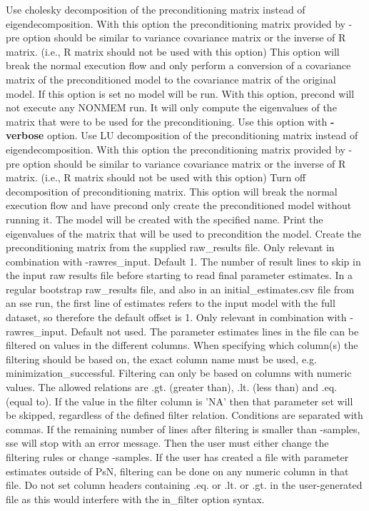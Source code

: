 \begin{optionlist}
Use cholesky decomposition of the preconditioning matrix instead of eigendecomposition.  With this option the preconditioning matrix provided by -pre option should be similar to variance covariance matrix or the inverse of R matrix.  (i.e., R matrix should not be used with this option)
\nextopt
{}
This option will break the normal execution flow and only perform a conversion of a covariance matrix of the preconditioned model to the covariance matrix of the original model.
If this option is set no model will be run.
\nextopt
{}
With this option, precond will not execute any NONMEM run.  It will only compute the eigenvalues of the matrix that were to be used for the preconditioning.  Use this option with {\bf-verbose} option.
\nextopt	
{}
Use LU decomposition of the preconditioning matrix instead of eigendecomposition.  With this option the preconditioning matrix provided by -pre option should be similar to variance covariance matrix or the inverse of R matrix.  (i.e., R matrix should not be used with this option)
\nextopt
{}
Turn off decomposition of preconditioning matrix.
\nextopt
{}
This option will break the normal execution flow and have precond only create the preconditioned model without running it.
The model will be created with the specified name.
\nextopt
{}
Print the eigenvalues of the matrix that will be used to precondition the model.
\nextopt
{}
Create the preconditioning matrix from the supplied raw\_results file.
\nextopt
{}
Only relevant in combination with -rawres\_input. Default 1. The number of result lines to skip in the input raw results file before starting to read final parameter estimates. In a regular bootstrap raw\_results file, and also in an initial\_estimates.csv file from an sse run, the first line of estimates refers to the input model with the full dataset, so therefore the default offset is 1.
\nextopt
{}
Only relevant in combination with -rawres\_input. Default not used. The parameter estimates lines in the file can be filtered on values in the different columns. When specifying which column(s) the filtering should be based on, the exact column name must be used, e.g. minimization\_successful. Filtering can only be based on columns with numeric values. The allowed relations are .gt. (greater than), .lt. (less than) and .eq. (equal to). If the value in the filter column is 'NA' then that parameter set will be skipped, regardless of the defined filter relation. Conditions are separated with commas. If the remaining number of lines after filtering is smaller than -samples, sse will stop with an error message. Then the user must either change the filtering rules or change -samples. If the user has created a file with parameter estimates outside of PsN, filtering can be done on any numeric column in that file. Do not set column headers containing .eq. or .lt. or .gt. in the user-generated file as this would interfere with the in\_filter option syntax.
\nextopt
\end{optionlist}

